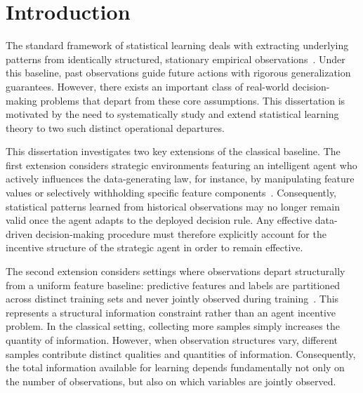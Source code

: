 \chapter{Introduction}
\label{ch:intro}


The standard framework of statistical learning deals with extracting underlying patterns from identically structured, stationary empirical observations~\cite{vapnik1998statistical,shalev-shwartz_ben-david_2014}. Under this baseline, past observations guide future actions with rigorous generalization guarantees. However, there exists an important class of real-world decision-making problems that depart from these core assumptions. This dissertation is motivated by the need to systematically study and extend statistical learning theory to two such distinct operational departures.

This dissertation investigates two key extensions of the classical baseline. The first extension considers strategic environments featuring an intelligent agent who actively influences the data-generating law, for instance, by manipulating feature values or selectively withholding specific feature components~\cite{hardt2016strategic,grossman1981informational,milgrom1981good}. Consequently, statistical patterns learned from historical observations may no longer remain valid once the agent adapts to the deployed decision rule. Any effective data-driven decision-making procedure must therefore explicitly account for the incentive structure of the strategic agent in order to remain effective.

The second extension considers settings where observations depart structurally from a uniform feature baseline: predictive features and labels are partitioned across distinct training sets and never jointly observed during training~\cite{little2019statistical,vapnik2009new}. This represents a structural information constraint rather than an agent incentive problem. In the classical setting, collecting more samples simply increases the quantity of information. However, when observation structures vary, different samples contribute distinct qualities and quantities of information. Consequently, the total information available for learning depends fundamentally not only on the number of observations, but also on which variables are jointly observed.


